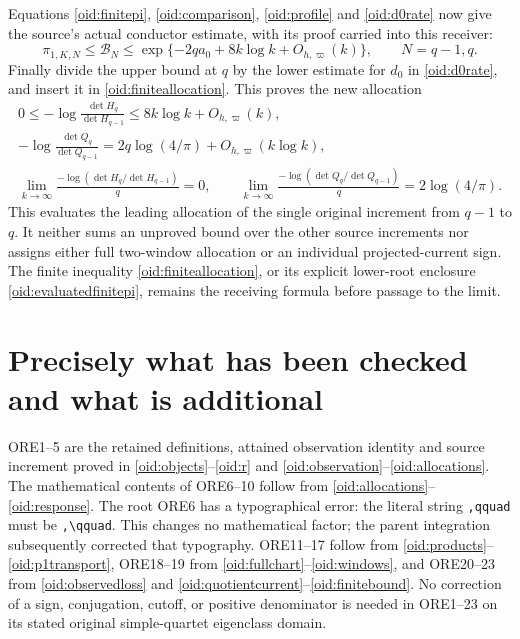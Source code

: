 \documentclass[11pt,a4paper]{article}
\begin{document}
Equations \eqref{oid:finitepi}, \eqref{oid:comparison},
\eqref{oid:profile} and \eqref{oid:d0rate} now give the source's
actual conductor estimate, with its proof carried into this receiver:
\begin{equation}\label{oid:pirate}
 \pi_{1,K,N}\le\mathcal B_N
 \le\exp\{-2qa_0+8k\log k+O_{h,\varpi}(k)\},
 \qquad N=q-1,q.
\end{equation}
Finally divide the upper bound at $q$ by the lower estimate for
$d_0$ in \eqref{oid:d0rate}, and insert it in
\eqref{oid:finiteallocation}. This proves the new allocation
\begin{equation}\label{oid:firstallocation}
 \boxed{\begin{gathered}
 0\le-\log\frac{\det H_q}{\det H_{q-1}}
 \le8k\log k+O_{h,\varpi}(k),\\
 -\log\frac{\det Q_q}{\det Q_{q-1}}
 =2q\log(4/\pi)+O_{h,\varpi}(k\log k),\\
 \lim_{k\to\infty}\frac{-\log(\det H_q/\det H_{q-1})}{q}=0,
 \qquad
 \lim_{k\to\infty}\frac{-\log(\det Q_q/\det Q_{q-1})}{q}
 =2\log(4/\pi).
 \end{gathered}}
\end{equation}
This evaluates the leading allocation of the single original
increment from $q-1$ to $q$. It neither sums an unproved bound over
the other source increments nor assigns either full two-window
allocation or an individual projected-current sign. The finite
inequality \eqref{oid:finiteallocation}, or its explicit lower-root
enclosure \eqref{oid:evaluatedfinitepi}, remains the receiving formula
before passage to the limit.

\section{Precisely what has been checked and what is additional}

ORE1--5 are the retained definitions, attained observation identity
and source increment proved in \eqref{oid:objects}--\eqref{oid:r}
and \eqref{oid:observation}--\eqref{oid:allocations}.
The mathematical contents of ORE6--10 follow from
\eqref{oid:allocations}--\eqref{oid:response}. The root ORE6 has
a typographical error: the literal string \texttt{,qquad} must be
\texttt{,\textbackslash qquad}. This changes no mathematical factor;
the parent integration subsequently corrected that typography.
ORE11--17 follow from \eqref{oid:products}--\eqref{oid:p1transport},
ORE18--19 from \eqref{oid:fullchart}--\eqref{oid:windows}, and
ORE20--23 from \eqref{oid:observedloss} and
\eqref{oid:quotientcurrent}--\eqref{oid:finitebound}. No correction
of a sign, conjugation, cutoff, or positive denominator is needed in
ORE1--23 on its stated original simple-quartet eigenclass domain.
\end{document}
